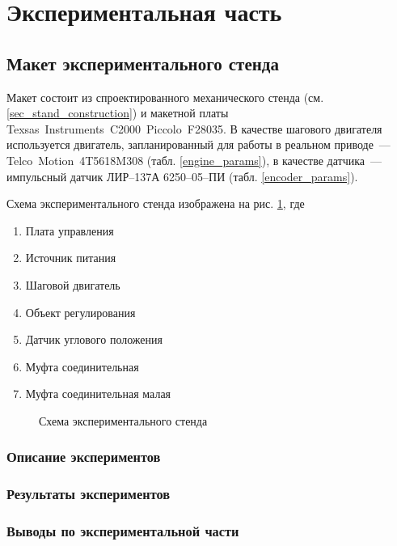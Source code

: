 \newpage
\section{Экспериментальная часть}
\subsection{Макет экспериментального стенда}

Макет состоит из спроектированного механического стенда
(см. \ref{sec_stand_construction}) и макетной платы
Texsas~Instruments~C2000~Piccolo~F28035.
В качестве шагового двигателя используется двигатель, запланированный для работы
в реальном приводе~--- Telco~Motion~4T5618M308 (табл. \ref{engine_params}), в
качестве датчика~--- импульсный датчик ЛИР--137А 6250--05--ПИ
(табл. \ref{encoder_params}).

Схема экспериментального стенда изображена на рис.
\ref{pic_experim_stand_scheme}, где

\begin{enumerate}
       \item Плата управления
       \item Источник питания
       \item Шаговой двигатель
       \item Объект регулирования
       \item Датчик углового положения
       \item Муфта соединительная
       \item Муфта соединительная малая
\end{enumerate}

\begin{figure}[hb]
    \centering
    \caption{Схема экспериментального стенда}
    \label{pic_experim_stand_scheme}
\end{figure}
\subsubsection{Описание экспериментов}

\subsubsection{Результаты экспериментов}

\subsubsection{Выводы по экспериментальной части}
